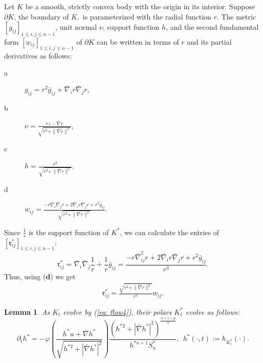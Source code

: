 \documentclass{amsart}
\newtheorem{lemma}[theorem]{Lemma}
\theoremstyle{definition}
\theoremstyle{remark}
\numberwithin{equation}{section}
\begin{document}
Let $K$ be a smooth, strictly convex body with the origin in its interior. Suppose $\partial K$, the boundary of $K,$ is parameterized with the radial function $r.$
The metric $[g_{ij}]_{1\leq i,j\leq n-1}$, unit normal $\nu$, support function $h$, and the second fundamental form $[w_{ij}]_{1\leq i,j\leq n-1}$ of $\partial K$
can be written in terms of $r$ and its partial derivatives as follows:
\begin{description}
  \item[a] $ g_{ij}=r^2\bar{g}_{ij}+\bar{\nabla}_ir\bar{\nabla}_jr,$
  \item[b] $ \nu=\frac{r z-\bar{\nabla}r}{\sqrt{r^2+\|\bar{\nabla}r\|^2}},$
  \item[c] $ h=\frac{r^2}{\sqrt{r^2+\|\bar{\nabla}r\|^2}},$
  \item[d] $ w_{ij}=\frac{-r\bar{\nabla}_i\bar{\nabla}_jr+2\bar{\nabla}_ir\bar{\nabla}_jr+
  r^2\bar{g}_{ij}}{\sqrt{r^2+\|\bar{\nabla}r\|^2}}.$
\end{description}
Since $\frac{1}{r}$ is the support function of $K^{\ast}$, we can calculate the entries of $[\mathfrak{r}^{\ast}_{ij}]_{1\leq i,j\leq n-1}$:
\[\mathfrak{r}^{\ast}_{ij}=\bar{\nabla}_i\bar{\nabla}_j\frac{1}{r}+\frac{1}{r}\bar{g}_{ij}=
\frac{-r\bar{\nabla}^2_{ij}r+2\bar{\nabla}_ir\bar{\nabla}_jr+r^2\bar{g}_{ij}}{r^3}.\]
Thus, using (\textbf{d}) we get
\begin{align*}
\mathfrak{r}^{\ast}_{ij}=\frac{\sqrt{r^2+\|\bar{\nabla}r\|^2}}{r^3}w_{ij}.
\end{align*}
\begin{lemma}\label{app1}
As $K_t$ evolve by (\ref{eq: flow4}), their polars $K_t^{\ast}$ evolve as follows:
\[\partial_th^{\ast}=-\varphi\left(\frac{h^{\ast}u+\bar{\nabla} h^{\ast}}{\sqrt{h^{\ast2}+|\bar{\nabla} h^{\ast}|^2}}\right)\frac{(h^{\ast2}+|\bar{\nabla} h^{\ast}|^2)^{\frac{n+1+p}{2}}}{h^{\ast n+1}S_n^{\ast}},~~h^{\ast}(\cdot,t):=h_{K_t^{\ast}}(\cdot).\]
\end{lemma}
\end{document}
